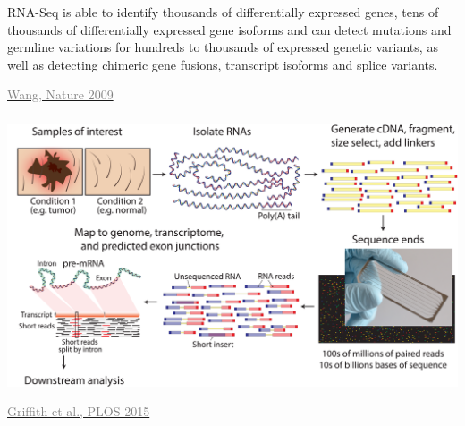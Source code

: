 \documentclass[x11names, svgnames]{beamer}
\begin{document}
%
%
%
\begin{frame}
  \frametitle{\four}
  \begin{center}
  RNA-Seq is able to identify thousands of differentially expressed genes, tens of thousands of differentially expressed gene isoforms and can detect mutations and germline variations for hundreds to thousands of expressed genetic variants, as well as detecting chimeric gene fusions, transcript isoforms and splice variants.
  \end{center}
  \begin{center}
    \vspace{2em}
    \footnotesize{\href{https://doi.org/10.1038/nrg2484}{\textcolor{gray}{Wang, Nature 2009}}}
  \end{center}
\end{frame}
\begin{frame}
  \frametitle{\four}
  \begin{center}
    \includegraphics[scale=0.55]{images/griffith-plos}
  \end{center}
  \begin{center}
    \vspace{1.5em}
    \footnotesize{\href{https://doi.org/10.1371/journal.pcbi.1004393}{\textcolor{gray}{Griffith et al., PLOS 2015}}}
  \end{center}
\end{frame}
\end{document}
